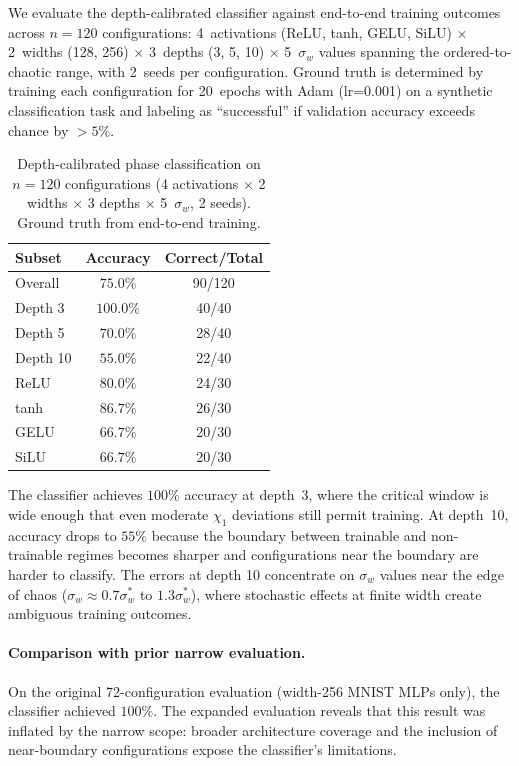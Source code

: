 \documentclass[10pt]{article}
\begin{document}
We evaluate the depth-calibrated classifier against end-to-end training outcomes across $n = 120$ configurations: 4~activations (ReLU, tanh, GELU, SiLU) $\times$ 2~widths (128, 256) $\times$ 3~depths (3, 5, 10) $\times$ 5~$\sigma_w$ values spanning the ordered-to-chaotic range, with 2~seeds per configuration.
Ground truth is determined by training each configuration for 20~epochs with Adam (lr=0.001) on a synthetic classification task and labeling as ``successful'' if validation accuracy exceeds chance by $>5\%$.

\begin{table}[t]
\centering
\caption{Depth-calibrated phase classification on $n = 120$ configurations (4 activations $\times$ 2 widths $\times$ 3 depths $\times$ 5~$\sigma_w$, 2 seeds). Ground truth from end-to-end training.}
\label{tab:calibrated}
\small
\begin{tabular}{@{}lcc@{}}
\toprule
\textbf{Subset} & \textbf{Accuracy} & \textbf{Correct/Total} \\
\midrule
Overall     & $75.0\%$  & 90/120 \\
\midrule
Depth 3     & $100.0\%$ & 40/40 \\
Depth 5     & $70.0\%$  & 28/40 \\
Depth 10    & $55.0\%$  & 22/40 \\
\midrule
ReLU        & $80.0\%$  & 24/30 \\
tanh        & $86.7\%$  & 26/30 \\
GELU        & $66.7\%$  & 20/30 \\
SiLU        & $66.7\%$  & 20/30 \\
\bottomrule
\end{tabular}
\end{table}

The classifier achieves $100\%$ accuracy at depth~3, where the critical window is wide enough that even moderate $\chi_1$ deviations still permit training. At depth~10, accuracy drops to $55\%$ because the boundary between trainable and non-trainable regimes becomes sharper and configurations near the boundary are harder to classify. The errors at depth 10 concentrate on $\sigma_w$ values near the edge of chaos ($\sigma_w \approx 0.7\sigma_w^*$ to $1.3\sigma_w^*$), where stochastic effects at finite width create ambiguous training outcomes.

\paragraph{Comparison with prior narrow evaluation.}
On the original 72-configuration evaluation (width-256 MNIST MLPs only), the classifier achieved $100\%$. The expanded evaluation reveals that this result was inflated by the narrow scope: broader architecture coverage and the inclusion of near-boundary configurations expose the classifier's limitations.
\end{document}
